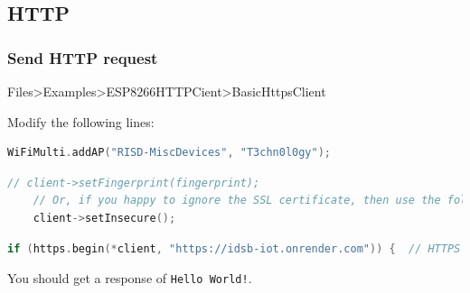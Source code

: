\documentclass[compress, aspectratio=32]{beamer}
\begin{document}
\subsection{HTTP}
\begin{frame}[fragile]
    \frametitle{Send HTTP request}
    Files>Examples>ESP8266HTTPCient>BasicHttpsClient
    \par Modify the following lines:

    \begin{lstlisting}[language=c, firstnumber=37]
    WiFiMulti.addAP("RISD-MiscDevices", "T3chn0l0gy");
    \end{lstlisting}
    
    \begin{lstlisting}[language=c, firstnumber=46]
    // client->setFingerprint(fingerprint);
    // Or, if you happy to ignore the SSL certificate, then use the following line instead:
    client->setInsecure();
    \end{lstlisting}

    \begin{lstlisting}[language=c, firstnumber=53]
    if (https.begin(*client, "https://idsb-iot.onrender.com")) {  // HTTPS
    \end{lstlisting}

    You should get a response of \verb|Hello World!|.
\end{frame}
\end{document}
